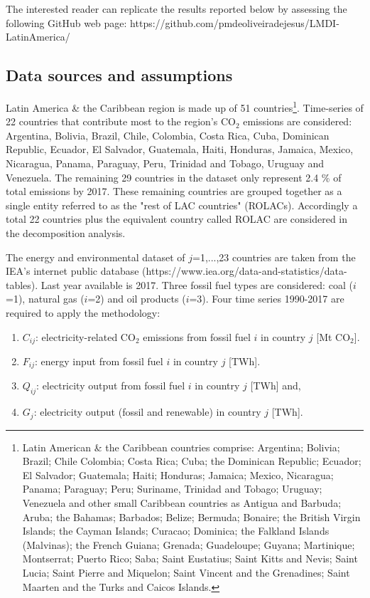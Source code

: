 \documentclass[energies,article,accept,moreauthors,12pt,a4paper]{mdpi} %
\begin{document}
The interested reader can replicate the results reported below by assessing the following GitHub web page: https://github.com/pmdeoliveiradejesus/LMDI-LatinAmerica/

\subsection{Data sources and assumptions} \label{basicres}

Latin America \& the Caribbean region is made up of 51 countries\footnote{Latin American \& the Caribbean countries comprise: Argentina; Bolivia; Brazil; Chile
Colombia; Costa Rica; Cuba;  the Dominican
Republic; Ecuador; El Salvador; Guatemala; Haiti;
Honduras; Jamaica; Mexico, Nicaragua; Panama; Paraguay;
Peru; Suriname, Trinidad and Tobago;
Uruguay; Venezuela and other small Caribbean countries as Antigua and
Barbuda; Aruba; the Bahamas; Barbados; Belize;
Bermuda; Bonaire; the British Virgin Islands;
the Cayman Islands; Curacao; Dominica; the Falkland Islands
(Malvinas); the French Guiana; Grenada; Guadeloupe;
Guyana; Martinique; Montserrat; Puerto Rico; Saba; Saint
Eustatius; Saint Kitts and Nevis;
Saint Lucia; Saint Pierre and Miquelon; Saint Vincent
and the Grenadines; Saint Maarten and the Turks and Caicos Islands.}. Time-series of 22 countries that contribute most to the region's CO$_2$ emissions are considered: Argentina, Bolivia, Brazil, Chile, Colombia,
 Costa Rica, Cuba, Dominican Republic, Ecuador, El Salvador, Guatemala, Haiti, Honduras, Jamaica, Mexico, Nicaragua, Panama, Paraguay,
 Peru, Trinidad and Tobago, Uruguay and Venezuela. The remaining 29 countries in the dataset only represent 2.4 \% of total emissions by 2017. These remaining countries are grouped together as a single entity referred to as the "rest of LAC countries" (ROLACs). Accordingly a total 22 countries plus the equivalent country called ROLAC are considered in the  decomposition analysis.
 
 
The energy and environmental dataset of $j$=1,...,23 countries are taken from the IEA's internet  public database (https://www.iea.org/data-and-statistics/data-tables). Last year available is 2017. Three fossil fuel types are considered: coal ($i$=1),  natural gas ($i$=2) and   oil products ($i$=3). Four time series 1990-2017 are required to apply the methodology: 

\begin{enumerate}
  \item $C_{ij}$: electricity-related CO$_2$ emissions from fossil fuel $i$ in country $j$  [Mt CO$_2$].

\item $F_{ij}$: energy input from fossil fuel $i$ in country $j$ [TWh]. 

\item $Q_{ij}$: electricity output from fossil fuel $i$ in country $j$ [TWh] and,  

\item $G_{j}$: electricity output (fossil and renewable) in country $j$ [TWh].
\end{enumerate}
\end{document}
